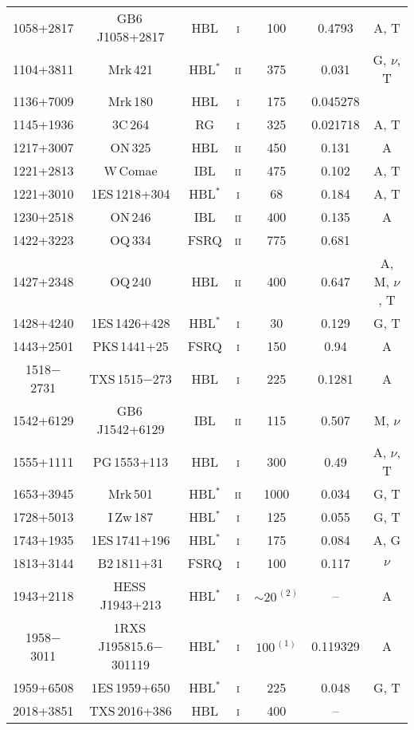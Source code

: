 \documentclass[a4paper,11pt]{article}
\begin{document}
\begin{table}[hbt]
\begin{tabular}{@{}cccccc@{\,\,}c@{\,}}
1058+2817 & GB6\,J1058+2817 & HBL & \textsc{i} & 100 & 0.4793 & A, T \\
1104+3811 & Mrk\,421 & HBL$^*$ & \textsc{ii} & 375 &  0.031  & G, $\nu$, T\\
1136+7009 & Mrk\,180 & HBL & \textsc{i} & 175 & 0.045278 & \\
1145+1936 & 3C\,264 & RG & \textsc{i} & 325 & 0.021718 & A, T \\
1217+3007 & ON\,325 & HBL & \textsc{ii} & 450 & 0.131 & A \\
1221+2813 & W\,Comae & IBL & \textsc{ii} & 475 & 0.102 & A, T\\
1221+3010 & 1ES\,1218+304 & HBL$^*$ & \textsc{i} & 68 & 0.184 & A, T \\
1230+2518 & ON\,246 & IBL & \textsc{ii} & 400 & 0.135 & A \\
1422+3223 & OQ\,334 & FSRQ & \textsc{ii} & 775 & 0.681 & \\
1427+2348 & OQ\,240 & HBL & \textsc{ii} & 400 & 0.647 & A, M, $\nu$, T\\
1428+4240 & 1ES\,1426+428 & HBL$^*$ & \textsc{i} & 30 & 0.129 & G, T\\
1443+2501 & PKS\,1441+25 & FSRQ & \textsc{i} & 150 & 0.94 & A \\
1518$-$2731 & TXS\,1515$-$273& HBL & \textsc{i} & 225 & 0.1281 &  A \\
1542+6129 & GB6\,J1542+6129 & IBL & \textsc{ii} & 115 & 0.507 &  M, $\nu$ \\
1555+1111 & PG\,1553+113 & HBL & \textsc{i} & 300 & 0.49 & A, $\nu$, T\\
1653+3945 & Mrk\,501 & HBL$^*$ & \textsc{ii} & 1000 & 0.034 & G, T\\
1728+5013 & I\,Zw\,187 & HBL$^*$ & \textsc{i} & 125 & 0.055 & G, T\\
1743+1935 & 1ES\,1741+196 & HBL$^*$ & \textsc{i} & 175 & 0.084 & A, G\\
1813+3144 & B2\,1811+31 & FSRQ & \textsc{i} & 100 & 0.117 & $\nu$ \\
1943+2118 & HESS\,J1943+213 & HBL$^*$ & \textsc{i} & $\sim 20^{\,(2)}$ & -- & A \\
1958$-$3011 & 1RXS\,J195815.6$-$301119 & HBL$^*$ & \textsc{i} & $100^{\,(1)}$ & 0.119329  & A\\
1959+6508 & 1ES\,1959+650 & HBL$^*$ & \textsc{i} & 225 & 0.048 & G, T\\
2018+3851 & TXS\,2016+386 & HBL & \textsc{i} & 400 & -- & \\

\end{tabular}
\end{table}
\end{document}
